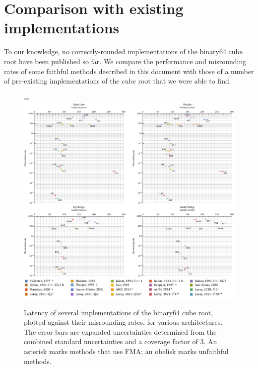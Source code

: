 ﻿\documentclass[10pt, a4paper, twoside]{basestyle}
\begin{document}
\section{Comparison with existing implementations}
\label{Comparison}
To our knowledge, no correctly-rounded implementations of the binary64 cube root have been published so far.
We compare the performance and misrounding rates of some faithful methods described in this document with those
of a number of pre-existing implementations of the cube root that we were able to find.
\begin{figure}[tb]
\begin{adjustwidth}{-4cm}{}\hsize=\linewidth
\includegraphics[width=\linewidth]{cbrt_latency_misrounding.pdf}
\caption{Latency of several implementations of the binary64 cube root, plotted against their misrounding rates, for various architectures.
The error bars are expanded uncertainties determined from the combined standard uncertainties and a coverage factor of $3$.
An asterisk marks methods that use FMA; an obelisk marks unfaithful methods.}
\end{adjustwidth}
\end{figure}
\end{document}
